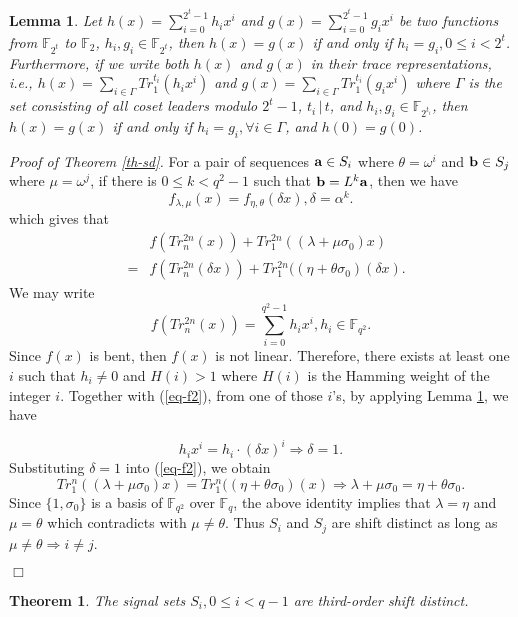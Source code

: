 \documentclass{article}
\newtheorem{theorem}{Theorem}
\newtheorem{lemma}{Lemma}
\newcommand{\F}{\ensuremath{\mathbb F}}
\newcommand{\done}{\hfill $\Box$ }
\newcommand{\abu}{{\bf{a}}}
\newcommand{\bbu}{{\bf{b}}}
\begin{document}
\begin{lemma} \label{le-eq} Let $h(x)=\sum_{i=0}^{2^t-1}h_ix^i$ and
$g(x)=\sum_{i=0}^{2^t-1}g_ix^i$ be  two functions from $\F_{2^t}$
to $\F_2$, $h_i, g_i \in \F_{2^t}$, then $h(x)=g(x)$ if and only
if $h_i=g_i, 0\le i<2^t$. Furthermore, if we write both $h(x)$ and
$g(x)$ in their trace representations, i.e., $h(x)=\sum_{i\in
\Gamma}Tr_1^{t_i}(h_ix^{i})$ and $g(x)=\sum_{i\in
\Gamma}Tr_1^{t_i}(g_ix^{i})$ where $\Gamma$ is the set consisting
of all coset leaders modulo $2^t-1$, $t_i\,|\,t$, and $h_i, g_i\in
\F_{2^{t_i}}$, then $h(x)=g(x)$ if and only if $h_i=g_i, \forall
i\in \Gamma$, and $h(0)=g(0)$.
\end{lemma}

 {\em Proof of Theorem \ref{th-sd}.} For a pair of sequences $\abu
\in S_{i}$ where $\theta=\omega^i$ and $\bbu\in S_j$ where $\mu=\omega^j$, if there is $0\le k<q^2-1$
such that $\bbu=L^k\abu$, then we have
\[
f_{\lambda, \mu}(x)=f_{\eta, \theta}(\delta x), \delta = \alpha^k.
\]
which gives that
 \begin{eqnarray}\label{eq-f2}
&&  f(Tr_n^{2n}(x))+
 Tr_1^{2n}((\lambda+ \mu \sigma_0)x) \nonumber  \\
 &=&
 f(Tr_n^{2n}(\delta x))+Tr_1^{2n}((\eta+\theta\sigma_0)(\delta x).
 \end{eqnarray}
 We may write
\begin{equation}\label{eq-tr}
f(Tr_n^{2n}(x))=\sum_{i=0}^{q^2-1} h_ix^i, h_i\in \F_{q^2}.
\end{equation}
Since $f(x)$ is bent, then $f(x)$ is not linear. Therefore, there
exists at least one $i$ such that $h_i\ne 0$ and $H(i)>1$ where $H(i)$ is the Hamming weight of the integer $i$.
Together with (\ref{eq-f2}), from one of those $i$'s, by applying
Lemma \ref{le-eq}, we have

\[
h_ix^i=h_i\cdot (\delta x)^i \Longrightarrow \delta =1. \]
Substituting $\delta=1$ into (\ref{eq-f2}), we obtain
\[
Tr_1^n((\lambda+ \mu
\sigma_0)x)=Tr_1^n((\eta+\theta\sigma_0)(x)\Longrightarrow
\lambda+ \mu \sigma_0=\eta+\theta\sigma_0.
\]
Since $\{1, \sigma_0\}$ is a basis of $\F_{q^2}$ over $\F_q$, the
above identity implies that $\lambda=\eta$ and $\mu=\theta$ which
contradicts with  $\mu \ne \theta$. Thus $S_{i}$ and
$S_{j}$ are shift distinct as long as $\mu\ne \theta \Longrightarrow i\not = j$.

 \done

\begin{theorem}\label{th-3sd}
The signal sets $S_i, 0\le i<q-1$   are third-order shift distinct.
\end{theorem}
\end{document}
